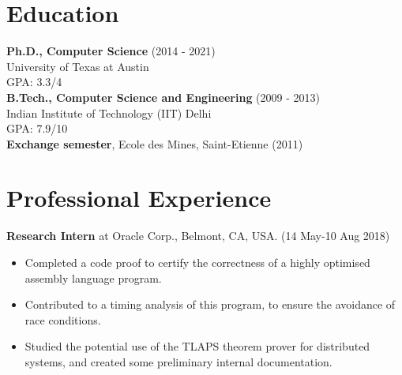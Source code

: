 \documentclass[margin]{res}
\begin{document}

\address{Department of Computer Science \\University of Texas at Austin }

\address{+1 512-952-0104 \\ \url{www.cs.utexas.edu/~mihir} }


\begin{resume}


\section{Education}
{\bf Ph.D., Computer Science} \hfill (2014 - 2021)\\
University of Texas at Austin\\
GPA: 3.3/4\\
{\bf B.Tech., Computer Science and Engineering} \hfill (2009 - 2013)\\
Indian Institute of Technology (IIT) Delhi\\
GPA: 7.9/10\\
{\bf Exchange semester}, Ecole des Mines, Saint-Etienne \hfill (2011)

\section{Professional Experience}

 {\bf Research Intern} at Oracle Corp., Belmont, CA, USA. \hfill (14
 May-10 Aug 2018)
 \begin{itemize} \itemsep -2pt  %
 \item Completed a code proof to certify the correctness of a highly
   optimised assembly language program.
 \item Contributed to a timing analysis of this program, to ensure the
   avoidance of race conditions.
 \item Studied the potential use of the TLAPS theorem prover for
   distributed systems, and created some preliminary internal
   documentation.
 \end{itemize}


\end{resume}
\end{document}
